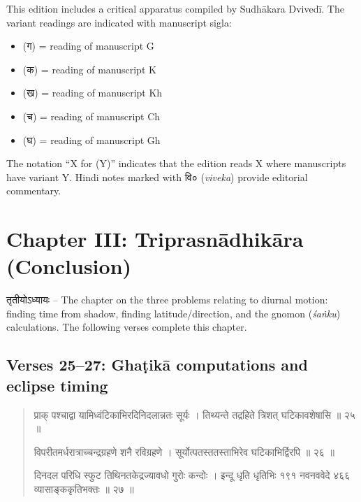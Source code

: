 \documentclass[11pt,a4paper]{article}
\newcommand{\dev}[1]{{\devanagarifont #1}}
\newenvironment{sanskritverse}{%
  \begin{quote}%
  \devanagarifont%
  \setlength{\leftmargin}{2em}%
}{\end{quote}}
\begin{document}
This edition includes a critical apparatus compiled by Sudhākara Dvivedī. The variant 
readings are indicated with manuscript sigla:
\begin{itemize}[label=\textbullet]
  \item \dev{(ग)} = reading of manuscript G
  \item \dev{(क)} = reading of manuscript K  
  \item \dev{(ख)} = reading of manuscript Kh
  \item \dev{(च)} = reading of manuscript Ch
  \item \dev{(घ)} = reading of manuscript Gh
\end{itemize}

The notation ``X \dev{for} (Y)'' indicates that the edition reads X where manuscripts 
have variant Y. Hindi notes marked with \dev{वि०} (\textit{viveka}) provide editorial 
commentary.

\newpage


\section*{Chapter III: Triprasnādhikāra (Conclusion)}

\dev{तृतीयोऽध्यायः} -- The chapter on the three problems relating to diurnal motion: 
finding time from shadow, finding latitude/direction, and the gnomon (\textit{śaṅku}) 
calculations. The following verses complete this chapter.

\subsection*{Verses 25--27: Ghaṭikā computations and eclipse timing}

\begin{sanskritverse}
\dev{प्राक् पश्चाद्वा यामिध्वंटिकाभिरदिनिदलान्नतः सूर्यः} ।
\dev{तिथ्यन्ते तद्रहिते त्रिशत् घटिकावशेषासि ॥ २५ ॥}

\dev{विपरीतमर्धरात्राच्चन्द्रग्रहणे शनै रविग्रहणे} ।
\dev{सूर्योत्पतस्ततस्ताभिरेव घटिकाभिर्द्विरपि ॥ २६ ॥}

\dev{दिनदल परिधि स्फुट तिथिनतकेद्रज्यावधो गुरोः कन्दोः} ।
\dev{इन्दू धृति धृतिभिः १९१ नवनववेदे ४६६ व्यासाङ्ककृतिभक्तः ॥ २७ ॥}
\end{sanskritverse}
\end{document}
